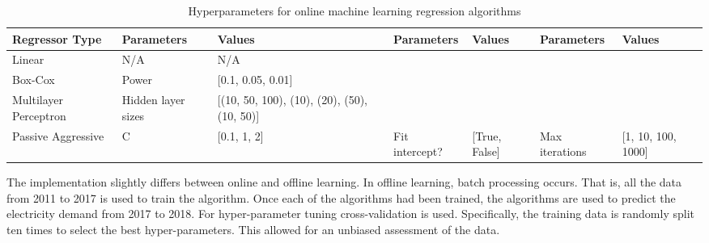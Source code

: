 \documentclass[final,3p,times,twocolumn,numbers]{elsarticle}
\begin{document}
\begin{table}
\centering
\begin{tabular}{@{}llp{3cm}lllp{1.6cm}@{}}
\toprule
\textbf{Regressor Type} & \textbf{Parameters} & \textbf{Values}                                  & \textbf{Parameters} & \textbf{Values}   & \textbf{Parameters} & \textbf{Values}        \\ \midrule
Linear                  & N/A                 & N/A                                              &                     &                   &                     &                        \\
Box-Cox                 & Power               & {[}0.1, 0.05, 0.01{]}                            &                     &                   &                     &                        \\
Multilayer Perceptron   & Hidden layer sizes  & {[}(10, 50, 100), (10),  (20), (50), (10, 50){]} & 
                    &                   &                     &                        \\ 
                    Passive Aggressive      & C                   & {[}0.1, 1, 2{]}                                  & Fit intercept?      & {[}True, False{]} & Max iterations      & {[}1, 10, 100, 1000{]} \\
\bottomrule
\end{tabular}%
\caption{Hyperparameters for online machine learning regression algorithms}
\label{table:hyperparameter-tuning-online}
\end{table}%


The implementation slightly differs between online and offline learning. In offline learning, batch processing occurs. That is, all the data from 2011 to 2017 is used to train the algorithm. Once each of the algorithms had been trained, the algorithms are used to predict the electricity demand from 2017 to 2018. For hyper-parameter tuning cross-validation is used. Specifically, the training data is randomly split ten times to select the best hyper-parameters. This allowed for an unbiased assessment of the data.  
\end{document}
